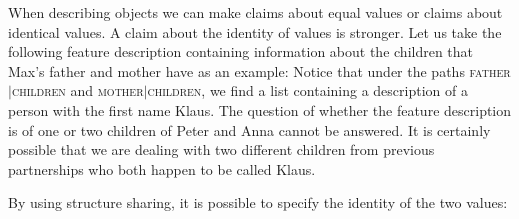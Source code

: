 When describing objects we can make claims about equal values or claims about identical values.
A claim about the identity of values is stronger. Let us take the following feature description containing
information about the children that Max's father and mother have as an example:
\ea
{}
\z
Notice that under the paths \textsc{father$|$children} and \textsc{mother$|$children}, we find a
list containing a description of a person with the first name Klaus. The question of whether the
feature description is of one or two children of Peter and Anna cannot be answered. It is certainly
possible that we are dealing with two different children from previous partnerships who both happen to be called
Klaus.

By using structure sharing, it is possible to specify the identity of the two values:

\ea
{}
\z

